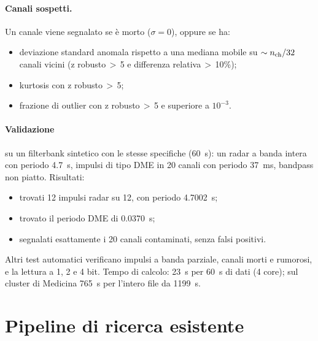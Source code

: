 \documentclass[11pt,a4paper]{article}
\begin{document}
\paragraph{Canali sospetti.} Un canale viene segnalato se è morto ($\sigma=0$), oppure se ha:
\begin{itemize}
  \item deviazione standard anomala rispetto a una mediana mobile su $\sim n_{\rm ch}/32$ canali vicini
    (z robusto\,$>$\,5 e differenza relativa\,$>$\,10\%);
  \item kurtosis con z robusto\,$>$\,5;
  \item frazione di outlier con z robusto\,$>$\,5 e superiore a $10^{-3}$.
\end{itemize}

\paragraph{Validazione} su un filterbank sintetico con le stesse specifiche (\SI{60}{\second}): un radar a banda
intera con periodo \SI{4.7}{\second}, impulsi di tipo DME in 20 canali con periodo \SI{37}{\milli\second}, bandpass
non piatto. Risultati:
\begin{itemize}
  \item trovati 12 impulsi radar su 12, con periodo \SI{4.7002}{\second};
  \item trovato il periodo DME di \SI{0.0370}{\second};
  \item segnalati esattamente i 20 canali contaminati, senza falsi positivi.
\end{itemize}
Altri test automatici verificano impulsi a banda parziale, canali morti e rumorosi, e la lettura a 1, 2 e 4 bit.
Tempo di calcolo: \SI{23}{\second} per \SI{60}{\second} di dati (4 core); sul cluster di Medicina
\SI{765}{\second} per l'intero file da \SI{1199}{\second}.

\FloatBarrier
\section{Pipeline di ricerca esistente}
\label{sec:pipeline}
\end{document}
